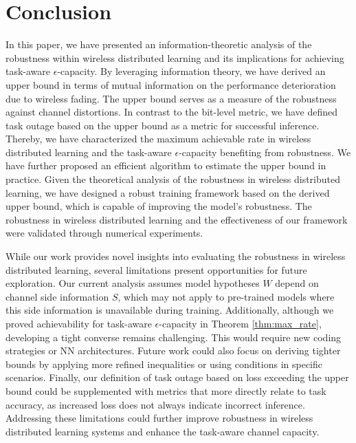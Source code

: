 \documentclass[lettersize,journal]{IEEEtran}
\theoremstyle{definition}
\theoremstyle{plain}
\begin{document}
\section{Conclusion}
\label{sec:conclusion}
In this paper, we have presented an information-theoretic analysis of the robustness within wireless distributed learning and its implications for achieving task-aware $\epsilon$-capacity. By leveraging information theory, we have derived an upper bound in terms of mutual information on the performance deterioration due to wireless fading. The upper bound serves as a measure of the robustness against channel distortions.
In contrast to the bit-level metric, we have defined task outage based on the upper bound as a metric for successful inference.
Thereby, we have characterized the maximum achievable rate in wireless distributed learning and the task-aware $\epsilon$-capacity benefiting from robustness.
We have further proposed an efficient algorithm to estimate the upper bound in practice.
Given the theoretical analysis of the robustness in wireless distributed learning, we have designed a robust training framework based on the derived upper bound, which is capable of improving the model's robustness.
The robustness in wireless distributed learning and the effectiveness of our framework were validated through numerical experiments.

While our work provides novel insights into evaluating the robustness in wireless distributed learning, several limitations present opportunities for future exploration. Our current analysis assumes model hypotheses $W$ depend on channel side information $S$, which may not apply to pre-trained models where this side information is unavailable during training. Additionally, although we proved achievability for task-aware $\epsilon$-capacity in Theorem \ref{thm:max_rate}, developing a tight converse remains challenging. This would require new coding strategies or NN architectures. Future work could also focus on deriving tighter bounds by applying more refined inequalities or using conditions in specific scenarios. Finally, our definition of task outage based on loss exceeding the upper bound could be supplemented with metrics that more directly relate to task accuracy, as increased loss does not always indicate incorrect inference. Addressing these limitations could further improve robustness in wireless distributed learning systems and enhance the task-aware channel capacity.
\end{document}

